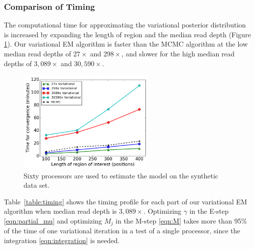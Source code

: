 \documentclass{bmcart}
\begin{document}
\subsubsection*{Comparison of Timing}
The computational time for approximating the variational posterior distribution is increased by expanding the length of region and the median read depth (Figure \ref{figure:timing}).
Our variational EM algorithm is faster than the MCMC algorithm at the low median read depths of $27\times$ and $298\times$, and slower for the high median read depths of $3,089\times$ and $30,590\times$.
\begin{figure}[ht]
\centering
\includegraphics[width=0.6\textwidth]{timing.png}
\caption{
Sixty processors are used to estimate the model on the synthetic data set.}\label{figure:timing}
\end{figure}

Table~\ref{table:timing} shows the timing profile for each part of our variational EM algorithm when median read depth is $3,089\times$.
Optimizing $\gamma$ in the E-step \eqref{eqn:partial_mu} and optimizing $M_j$ in the M-step \eqref{eqn:M} takes more than 95\% of the time of one variational iteration in a test of a single processor, since the integration \eqref{eqn:integration} is needed.
\end{document}
